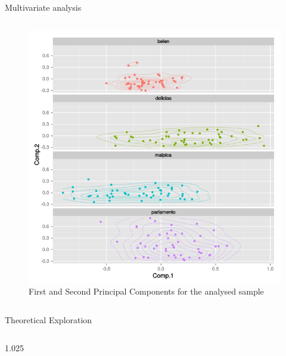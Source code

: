 \documentclass[final]{beamer}
\newlength{\onecolwid}
\newlength{\twocolwid}
\begin{document}
\begin{frame}[t]
\begin{columns}[t]
\begin{column}{\twocolwid}
\begin{block}{Multivariate analysis}
\begin{columns}[t,totalwidth=\twocolwid]
\begin{column}{\onecolwid} %


\begin{figure}
\includegraphics[width=0.6\linewidth]{images/fig2.png}
\caption{First and Second Principal Components for the analysed sample}
\label{fig:pca}
\end{figure}

\end{column}
\end{columns}

\end{block}

\begin{block}{Theoretical Exploration}

\begin{columns}[t,totalwidth=\twocolwid]

\begin{column}{1.025\onecolwid} %


\end{column}
\end{columns}
\end{block}
\end{column}
\end{columns}
\end{frame}
\end{document}
